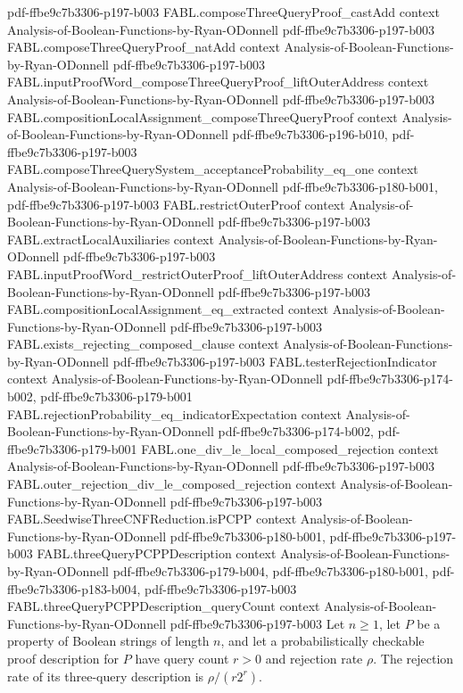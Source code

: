 \begin{theorem}
  {pdf-ffbe9c7b3306-p197-b003}
\proofstep
  {FABL.composeThreeQueryProof_castAdd}
  {context}
  {Analysis-of-Boolean-Functions-by-Ryan-ODonnell}
  {pdf-ffbe9c7b3306-p197-b003}
\proofstep
  {FABL.composeThreeQueryProof_natAdd}
  {context}
  {Analysis-of-Boolean-Functions-by-Ryan-ODonnell}
  {pdf-ffbe9c7b3306-p197-b003}
\proofstep
  {FABL.inputProofWord_composeThreeQueryProof_liftOuterAddress}
  {context}
  {Analysis-of-Boolean-Functions-by-Ryan-ODonnell}
  {pdf-ffbe9c7b3306-p197-b003}
\proofstep
  {FABL.compositionLocalAssignment_composeThreeQueryProof}
  {context}
  {Analysis-of-Boolean-Functions-by-Ryan-ODonnell}
  {pdf-ffbe9c7b3306-p196-b010,
    pdf-ffbe9c7b3306-p197-b003}
\proofstep
  {FABL.composeThreeQuerySystem_acceptanceProbability_eq_one}
  {context}
  {Analysis-of-Boolean-Functions-by-Ryan-ODonnell}
  {pdf-ffbe9c7b3306-p180-b001,
    pdf-ffbe9c7b3306-p197-b003}
\proofstep
  {FABL.restrictOuterProof}
  {context}
  {Analysis-of-Boolean-Functions-by-Ryan-ODonnell}
  {pdf-ffbe9c7b3306-p197-b003}
\proofstep
  {FABL.extractLocalAuxiliaries}
  {context}
  {Analysis-of-Boolean-Functions-by-Ryan-ODonnell}
  {pdf-ffbe9c7b3306-p197-b003}
\proofstep
  {FABL.inputProofWord_restrictOuterProof_liftOuterAddress}
  {context}
  {Analysis-of-Boolean-Functions-by-Ryan-ODonnell}
  {pdf-ffbe9c7b3306-p197-b003}
\proofstep
  {FABL.compositionLocalAssignment_eq_extracted}
  {context}
  {Analysis-of-Boolean-Functions-by-Ryan-ODonnell}
  {pdf-ffbe9c7b3306-p197-b003}
\proofstep
  {FABL.exists_rejecting_composed_clause}
  {context}
  {Analysis-of-Boolean-Functions-by-Ryan-ODonnell}
  {pdf-ffbe9c7b3306-p197-b003}
\proofstep
  {FABL.testerRejectionIndicator}
  {context}
  {Analysis-of-Boolean-Functions-by-Ryan-ODonnell}
  {pdf-ffbe9c7b3306-p174-b002,
    pdf-ffbe9c7b3306-p179-b001}
\proofstep
  {FABL.rejectionProbability_eq_indicatorExpectation}
  {context}
  {Analysis-of-Boolean-Functions-by-Ryan-ODonnell}
  {pdf-ffbe9c7b3306-p174-b002,
    pdf-ffbe9c7b3306-p179-b001}
\proofstep
  {FABL.one_div_le_local_composed_rejection}
  {context}
  {Analysis-of-Boolean-Functions-by-Ryan-ODonnell}
  {pdf-ffbe9c7b3306-p197-b003}
\proofstep
  {FABL.outer_rejection_div_le_composed_rejection}
  {context}
  {Analysis-of-Boolean-Functions-by-Ryan-ODonnell}
  {pdf-ffbe9c7b3306-p197-b003}
\proofstep
  {FABL.SeedwiseThreeCNFReduction.isPCPP}
  {context}
  {Analysis-of-Boolean-Functions-by-Ryan-ODonnell}
  {pdf-ffbe9c7b3306-p180-b001,
    pdf-ffbe9c7b3306-p197-b003}
\proofstep
  {FABL.threeQueryPCPPDescription}
  {context}
  {Analysis-of-Boolean-Functions-by-Ryan-ODonnell}
  {pdf-ffbe9c7b3306-p179-b004,
    pdf-ffbe9c7b3306-p180-b001,
    pdf-ffbe9c7b3306-p183-b004,
    pdf-ffbe9c7b3306-p197-b003}
\proofstep
  {FABL.threeQueryPCPPDescription_queryCount}
  {context}
  {Analysis-of-Boolean-Functions-by-Ryan-ODonnell}
  {pdf-ffbe9c7b3306-p197-b003}
Let $n\ge 1$, let $P$ be a property of Boolean strings of length $n$, and let a
probabilistically checkable proof description for $P$ have query count $r>0$ and
rejection rate $\rho$. The rejection rate of its three-query description is
$\rho/(r2^r)$.
\end{theorem}

